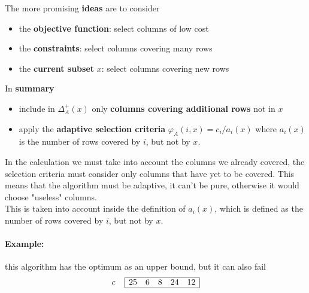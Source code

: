 The more promising \textbf{ideas} are to consider
\begin{itemize}
	\item the \textbf{objective function}: select columns of low cost
	\item the \textbf{constraints}: select columns covering many rows
	\item the \textbf{current subset} $x$: select columns covering new rows
\end{itemize}

In \textbf{summary}
\begin{itemize}
	\item include in $\Delta_A^+ (x)$ only \textbf{columns covering additional rows} not in $x$
	\item apply the \textbf{adaptive selection criteria} $\varphi_A (i, x) = c_i / a_i (x)$ where $a_i (x)$ is the number of rows covered by $i$, but not by $x$. 
\end{itemize}

In the calculation we must take into account the columns we already covered, the selection criteria must consider only columns that have yet to be covered. This means that the algorithm must be adaptive, it can't be pure, otherwise it would choose "useless" columns.\\
This is taken into account inside the definition of $a_i (x)$, which is defined as the number of rows covered by $i$, but not by $x$. \\

\newpage

\paragraph{Example:} this algorithm has the optimum as an upper bound, but it can also fail
$$
c \;\;\;\;
\begin{array}{| c c c c c |}
	\hline
	25 & 6 & 8 & 24 & 12 \\
	\hline
\end{array}
$$

